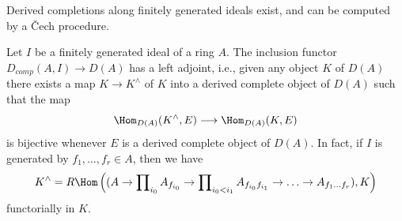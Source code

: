 \begin{lemma}
\label{lemma-derived-completion}
\begin{slogan}
Derived completions along finitely generated ideals exist, and can
be computed by a {\v C}ech procedure.
\end{slogan}
Let $I$ be a finitely generated ideal of a ring $A$.
The inclusion functor $D_{comp}(A, I) \to D(A)$ has a
left adjoint, i.e., given any object $K$ of $D(A)$ there
exists a map $K \to K^\wedge$ of $K$ into a derived complete
object of $D(A)$ such that the map
$$
\Hom_{D(A)}(K^\wedge, E) \longrightarrow \Hom_{D(A)}(K, E)
$$
is bijective whenever $E$ is a derived complete object of $D(A)$.
In fact, if $I$ is generated by $f_1, \ldots, f_r \in A$, then we have
$$
K^\wedge = R\Hom\left((A \to \prod\nolimits_{i_0} A_{f_{i_0}} \to
\prod\nolimits_{i_0 < i_1} A_{f_{i_0}f_{i_1}}
\to \ldots \to A_{f_1\ldots f_r}), K\right)
$$
functorially in $K$.
\end{lemma}